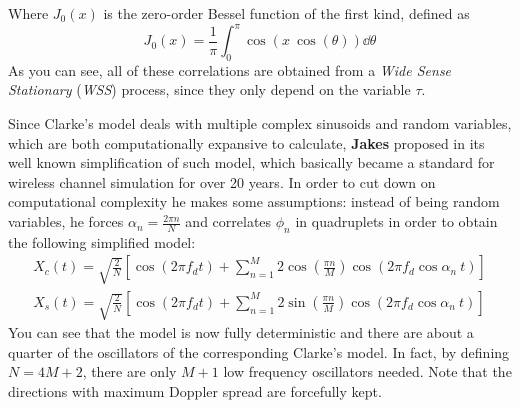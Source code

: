 %
Where $J_0(x)$ is the zero-order Bessel function of the first kind, defined as%
%
\begin{equation}
J_0(x) = \frac{1}{\pi} \int_0^\pi \cos( x \ \cos(\theta)) \dd{\theta}
\end{equation}%
%
As you can see, all of these correlations are obtained from a \textit{Wide Sense Stationary} (\textit{WSS}) process, since they only depend on the variable $\tau$.

Since Clarke's model deals with multiple complex sinusoids and random variables, which are both computationally expansive to calculate, \textbf{Jakes} proposed in \cite{jakes} its well known simplification of such model, which basically became a standard for wireless channel simulation for over 20 years. In order to cut down on computational complexity he makes some assumptions: instead of being random variables, he forces $\alpha_n = \frac{2\pi n}{N}$ and correlates $\phi_n$ in quadruplets in order to obtain the following simplified model:%
%
\begin{subequations}
\begin{align}\label{eq:jakes_xc}
X_c(t) = \sqrt{\frac{2}{N}} \left[ \cos(2\pi f_d t) + \sum_{n=1}^{M} 2\cos \left( \frac{\pi n}{M} \right) \cos( 2\pi f_d \cos \alpha_n \ t) \right]\\
\label{eq:jakes_xs}
X_s(t) = \sqrt{\frac{2}{N}} \left[ \cos(2\pi f_d t) + \sum_{n=1}^{M} 2\sin \left( \frac{\pi n}{M} \right) \cos( 2\pi f_d \cos \alpha_n \ t) \right]
\end{align}
\end{subequations}%
%
You can see that the model is now fully deterministic and there are about a quarter of the oscillators of the corresponding Clarke's model. In fact, by defining $N = 4M+2$, there are only $M+1$ low frequency oscillators needed. Note that the directions with maximum Doppler spread are forcefully kept.

